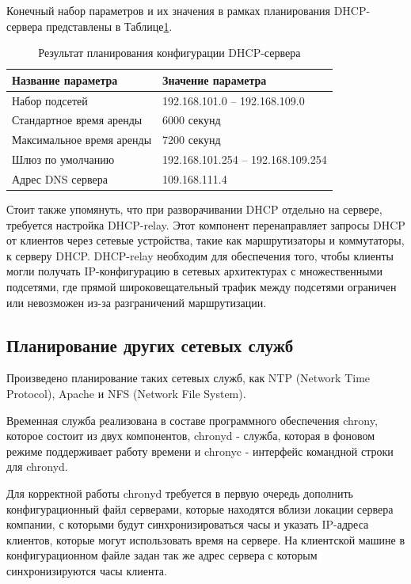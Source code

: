 Конечный набор параметров и их значения в рамках планирования DHCP-сервера представлены в Таблице\;\ref{table:dhcp_resault}.

\begin{table}[H]
\centering
{}
\caption{Результат планирования конфигурации DHCP-сервера\;\label{table:dhcp_resault}}
\small
\begin{tabularx}{\textwidth}{|X|X|}
\hline
Название параметра 			&	Значение параметра \\ \hline
Набор подсетей				&	192.168.101.0 – 192.168.109.0 \\ \hline
Стандартное время аренды	&	6000 секунд \\ \hline
Максимальное время аренды	&	7200 секунд \\ \hline
Шлюз по умолчанию			&	192.168.101.254 – 192.168.109.254 \\ \hline
Адрес DNS сервера			&	109.168.111.4 \\ \hline
\end{tabularx}
\end{table}

Стоит также упомянуть, что при разворачивании DHCP отдельно на сервере, требуется настройка DHCP-relay. Этот компонент перенаправляет запросы DHCP от клиентов через сетевые устройства, такие как маршрутизаторы и коммутаторы, к серверу DHCP. DHCP-relay необходим для обеспечения того, чтобы клиенты могли получать IP-конфигурацию в сетевых архитектурах с множественными подсетями, где прямой широковещательный трафик между подсетями ограничен или невозможен из-за разграничений маршрутизации.

\subsection{Планирование других сетевых служб}

Произведено планирование таких сетевых служб, как NTP (Network Time Protocol), Apache и NFS (Network File System).

Временная служба реализована в составе программного обеспечения chrony, которое состоит из двух компонентов, chronyd - служба, которая в фоновом режиме поддерживает работу времени и chronyc - интерфейс командной строки для chronyd.

Для корректной работы chronyd требуется в первую очередь дополнить конфигурационный файл серверами, которые находятся вблизи локации сервера компании, с которыми будут синхронизироваться часы и указать IP-адреса клиентов, которые могут использовать время на сервере. На клиентской машине в конфигурационном файле задан так же адрес сервера с которым синхронизируются часы клиента.


